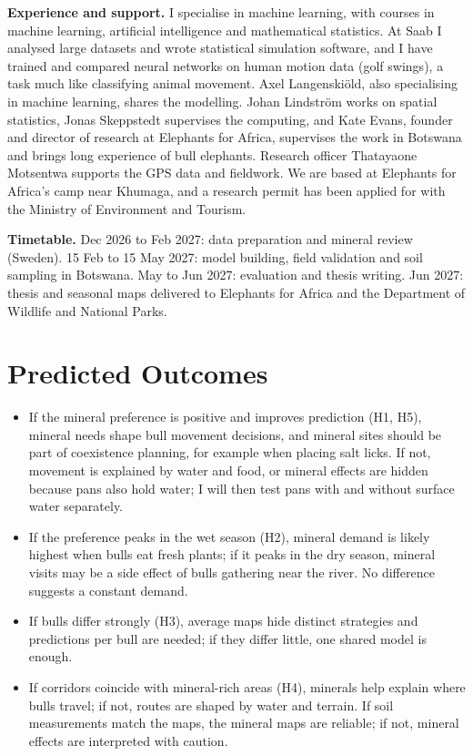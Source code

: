 \documentclass[11pt,a4paper]{article}
\begin{document}
\textbf{Experience and support.} I specialise in machine learning, with courses in machine learning, artificial intelligence and mathematical statistics. At Saab I analysed large datasets and wrote statistical simulation software, and I have trained and compared neural networks on human motion data (golf swings), a task much like classifying animal movement. Axel Langenskiöld, also specialising in machine learning, shares the modelling. Johan Lindström works on spatial statistics, Jonas Skeppstedt supervises the computing, and Kate Evans, founder and director of research at Elephants for Africa, supervises the work in Botswana and brings long experience of bull elephants. Research officer Thatayaone Motsentwa supports the GPS data and fieldwork. We are based at Elephants for Africa's camp near Khumaga, and a research permit has been applied for with the Ministry of Environment and Tourism.

\textbf{Timetable.} Dec 2026 to Feb 2027: data preparation and mineral review (Sweden). 15 Feb to 15 May 2027: model building, field validation and soil sampling in Botswana. May to Jun 2027: evaluation and thesis writing. Jun 2027: thesis and seasonal maps delivered to Elephants for Africa and the Department of Wildlife and National Parks.

\section{Predicted Outcomes}
\begin{itemize}
  \item If the mineral preference is positive and improves prediction (H1, H5), mineral needs shape bull movement decisions, and mineral sites should be part of coexistence planning, for example when placing salt licks. If not, movement is explained by water and food, or mineral effects are hidden because pans also hold water; I will then test pans with and without surface water separately.
  \item If the preference peaks in the wet season (H2), mineral demand is likely highest when bulls eat fresh plants; if it peaks in the dry season, mineral visits may be a side effect of bulls gathering near the river. No difference suggests a constant demand.
  \item If bulls differ strongly (H3), average maps hide distinct strategies and predictions per bull are needed; if they differ little, one shared model is enough.
  \item If corridors coincide with mineral-rich areas (H4), minerals help explain where bulls travel; if not, routes are shaped by water and terrain. If soil measurements match the maps, the mineral maps are reliable; if not, mineral effects are interpreted with caution.
\end{itemize}
\end{document}
